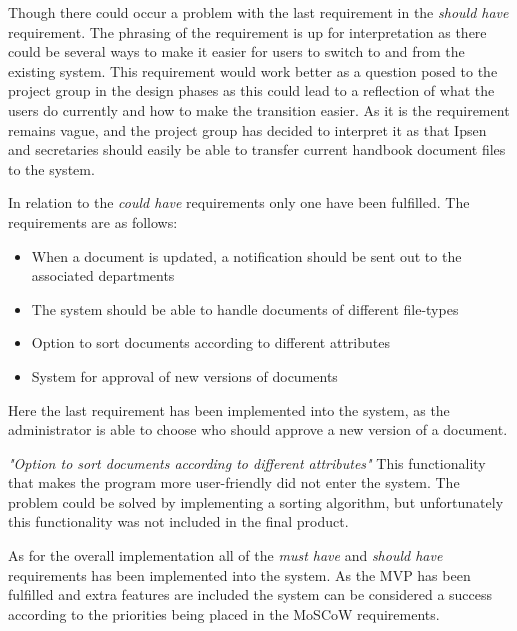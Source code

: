 Though there could occur a problem with the last requirement in the \textit{should have} requirement.
The phrasing of the requirement is up for interpretation as there could be several ways to make it easier for users to switch to and from the existing system.
This requirement would work better as a question posed to the project group in the design phases as this could lead to a reflection of what the users do currently and how to make the transition easier.
As it is the requirement remains vague, and the project group has decided to interpret it as that Ipsen and secretaries should easily be able to transfer current handbook document files to the system.

In relation to the \textit{could have} requirements only one have been fulfilled.
The requirements are as follows:

 \begin{itemize}
 	\item
    When a document is updated, a notification should be sent out to the associated departments
	\item
    The system should be able to handle documents of different file-types
    \item
    Option to sort documents according to different attributes
    \item
    System for approval of new versions of documents
\end{itemize}

Here the last requirement has been implemented into the system, as the administrator is able to choose who should approve a new version of a document.

\textit{"Option to sort documents according to different attributes"}
This functionality that makes the program more user-friendly did not enter the system.
The problem could be solved by implementing a sorting algorithm, but unfortunately this functionality was not included in the final product.

As for the overall implementation all of the \textit{must have} and \textit{should have} requirements has been implemented into the system.
As the MVP has been fulfilled and extra features are included the system can be considered a success according to the priorities being placed in the MoSCoW requirements.


